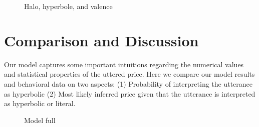 \documentclass{article} %
\begin{document}

\begin{figure}[t]
\caption{Halo, hyperbole, and valence}
\end{figure}


\section{Comparison and Discussion}
Our model captures some important intuitions regarding the numerical values and statistical properties of the uttered price. Here we compare our model results and behavioral data on two aspects: (1) Probability of interpreting the utterance as hyperbolic (2) Most likely inferred price given that the utterance is interpreted as hyperbolic or literal.

\begin{figure}[tl]
\caption{Model full}
\end{figure}
\end{document}
